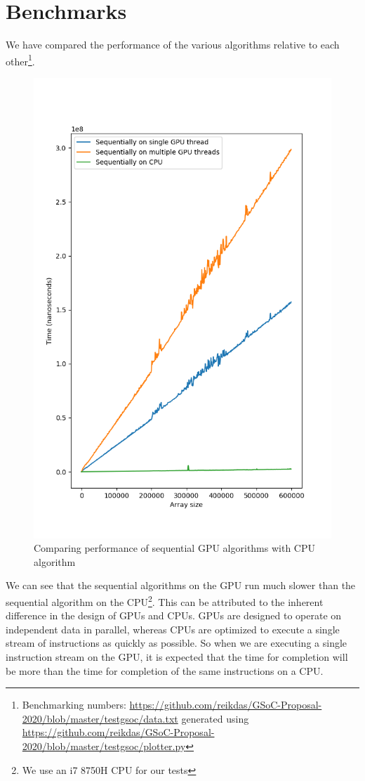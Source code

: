 \documentclass{article}
\begin{document}
\pagebreak
\section{Benchmarks}
We have compared the performance of the various algorithms relative to each other\footnote{Benchmarking numbers: \url{https://github.com/reikdas/GSoC-Proposal-2020/blob/master/testgsoc/data.txt} generated using \url{https://github.com/reikdas/GSoC-Proposal-2020/blob/master/testgsoc/plotter.py}}.
\begin{figure}[H]
\hfill\includegraphics[scale=0.5]{Graphics/naivegpucpu.png}\hspace*{\fill}
\caption{Comparing performance of sequential GPU algorithms with CPU algorithm}
\end{figure}
We can see that the sequential algorithms on the GPU run much slower than the sequential algorithm on the CPU\footnote{We use an i7 8750H CPU for our tests}. This can be attributed to the inherent difference in the design of GPUs and CPUs. GPUs are designed to operate on independent data in parallel, whereas CPUs are optimized to execute a single stream of instructions as quickly as possible. So when we are executing a single instruction stream on the GPU, it is expected that the time for completion will be more than the time for completion of the same instructions on a CPU.
\end{document}
